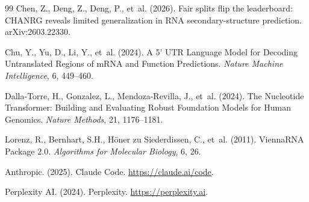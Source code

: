 \documentclass[11pt]{article}
\begin{document}
\begin{thebibliography}{99}
Chen, Z., Deng, Z., Deng, P., et~al. (2026).
Fair splits flip the leaderboard: CHANRG reveals limited generalization
in RNA secondary-structure prediction.
arXiv:2603.22330.

Chu, Y., Yu, D., Li, Y., et~al. (2024).
A 5' UTR Language Model for Decoding Untranslated Regions of mRNA and
Function Predictions.
\emph{Nature Machine Intelligence}, 6, 449--460.

Dalla-Torre, H., Gonzalez, L., Mendoza-Revilla, J., et~al. (2024).
The Nucleotide Transformer: Building and Evaluating Robust Foundation
Models for Human Genomics.
\emph{Nature Methods}, 21, 1176--1181.

Lorenz, R., Bernhart, S.H., H\"oner zu Siederdissen, C., et~al. (2011).
ViennaRNA Package 2.0.
\emph{Algorithms for Molecular Biology}, 6, 26.

Anthropic. (2025).
Claude Code. \url{https://claude.ai/code}.

Perplexity AI. (2024).
Perplexity. \url{https://perplexity.ai}.

\end{thebibliography}
\end{document}
